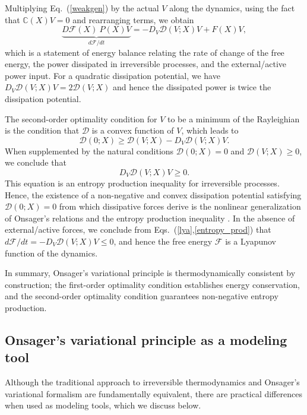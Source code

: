 \documentclass[12pt]{iopart}
\begin{document}
	Multiplying Eq.~(\ref{weakgen}) by the actual $V$ along the dynamics, using the fact that $\mathbb{C}(X)V=0$  and rearranging terms, we obtain
	\begin{equation}
		\underbrace{D\mathcal{F}(X)~P(X) V}_{d{\mathcal{F}}/dt} = -D_V\mathcal{D}(V;X) V + F(X)V,
		\label{lya}
	\end{equation}
	which is a statement of energy balance relating the rate of change of the free energy, the power dissipated in irreversible processes, and the external/active power input. For a quadratic dissipation potential, we have $D_V\mathcal{D}(V;X)V = 2 \mathcal{D}(V;X)$ and hence the dissipated power is twice the dissipation potential. 
	
	The second-order optimality condition for $V$ to be a minimum of the Rayleighian is the condition that $\mathcal{D}$ is a convex function of $V$, 
	which leads to
	\begin{equation}
		\mathcal{D}(0;X) \ge \mathcal{D}(V;X) - D_V\mathcal{D}(V;X)V.
	\end{equation}
When supplemented by the natural conditions $\mathcal{D}(0;X) = 0$ and $\mathcal{D}(V;X)\ge 0$, we conclude that  
	\begin{equation}
		\label{entropy_prod}
		D_V\mathcal{D}(V;X)V \ge 0.
	\end{equation}
	This equation is an entropy production inequality for irreversible processes. Hence, the existence of a non-negative and convex dissipation potential satisfying $\mathcal{D}(0;X) = 0$ from which dissipative forces derive is the nonlinear generalization of Onsager's relations and the entropy production inequality \cite{EDELEN1972481,mielke2016generalization}. In the absence of external/active forces, we conclude from Eqs.~(\ref{lya},\ref{entropy_prod}) that $d{\mathcal{F}}/dt = - D_V\mathcal{D}(V;X)V \le 0$, and hence the free energy $\mathcal{F}$ is a Lyapunov function of the dynamics.
	
	In summary, Onsager's variational principle is thermodynamically consistent by construction; the first-order optimality condition establishes energy conservation, and the second-order optimality condition guarantees non-negative entropy production. 
	
	
	\subsection{Onsager's variational principle as a modeling tool}
	
	Although the traditional approach to irreversible thermodynamics and  Onsager's variational formalism are fundamentally equivalent, there are practical differences when used as modeling tools, which we discuss below.
	
\end{document}
